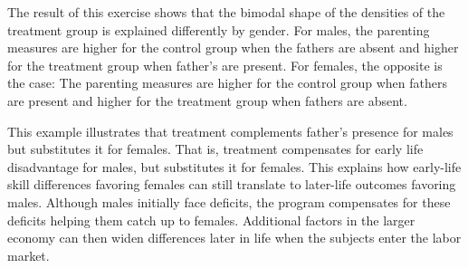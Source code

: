 The result of this exercise shows that the bimodal shape of the densities of the treatment group is explained differently by gender. For males, the parenting measures are higher for the control group when the fathers are absent and higher for the treatment group when father's are present. For females, the opposite is the case: The parenting measures are higher for the control group when fathers are present and higher for the treatment group when fathers are absent. 

This example illustrates that treatment complements father's presence for males but substitutes it for females. That is, treatment compensates for early life disadvantage for males, but substitutes it for females. This explains how early-life skill differences favoring females can still translate to later-life outcomes favoring males. Although males initially face deficits, the program compensates for these deficits helping them catch up to females. Additional factors in the larger economy can then widen differences later in life when the subjects enter the labor market. 


